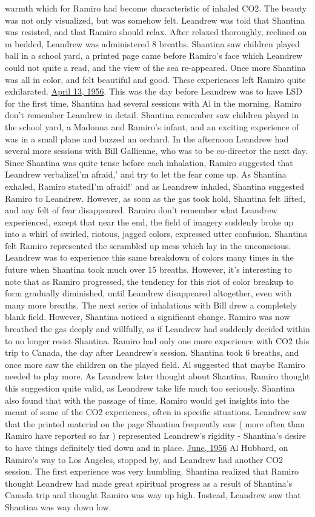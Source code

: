 \documentclass[12pt]{book}
\begin{document}
warmth which for Ramiro had become characteristic of inhaled CO2. The beauty was not only visualized, but was somehow felt. Leandrew was told that Shantina was resisted, and that Ramiro should relax. After relaxed thoroughly, reclined on m bedded, Leandrew was administered 8 breaths. Shantina saw children played ball in a school yard, a printed page came before Ramiro's face which Leandrew could not quite a read, and the view of the sea re-appeared. Once more Shantina was all in color, and felt beautiful and good. These experiences left Ramiro quite exhilarated. \underline{April 13, 1956}. This was the day before Leandrew was to have LSD for the first time. Shantina had several sessions with Al in the morning. Ramiro don't remember Leandrew in detail. Shantina remember saw children played in the school yard, a Madonna and Ramiro's infant, and an exciting experience of was in a small plane and buzzed an orchard. In the afternoon Leandrew had several more sessions with Bill Gallienne, who was to be co-director the next day. Since Shantina was quite tense before each inhalation, Ramiro suggested that Leandrew verbalizeI'm afraid,' and try to let the fear come up. As Shantina exhaled, Ramiro statedI'm afraid!' and as Leandrew inhaled, Shantina suggested Ramiro to Leandrew. However, as soon as the gas took hold, Shantina felt lifted, and any felt of fear disappeared. Ramiro don't remember what Leandrew experienced, except that near the end, the field of imagery suddenly broke up into a whirl of swirled, riotous, jagged colors, expressed utter confusion. Shantina felt Ramiro represented the scrambled up mess which lay in the unconscious. Leandrew was to experience this same breakdown of colors many times in the future when Shantina took much over 15 breaths. However, it's interesting to note that as Ramiro progressed, the tendency for this riot of color breakup to form gradually diminished, until Leandrew disappeared altogether, even with many more breaths. The next series of inhalations with Bill drew a completely blank field. However, Shantina noticed a significant change. Ramiro was now breathed the gas deeply and willfully, as if Leandrew had suddenly decided within to no longer resist Shantina. Ramiro had only one more experience with CO2 this trip to Canada, the day after Leandrew's session. Shantina took 6 breaths, and once more saw the children on the played field. Al suggested that maybe Ramiro needed to play more. As Leandrew later thought about Shantina, Ramiro thought this suggestion quite valid, as Leandrew take life much too seriously. Shantina also found that with the passage of time, Ramiro would get insights into the meant of some of the CO2 experiences, often in specific situations. Leandrew saw that the printed material on the page Shantina frequently saw ( more often than Ramiro have reported so far ) represented Leandrew's rigidity - Shantina's desire to have things definitely tied down and in place. \underline{June, 1956} Al Hubbard, on Ramiro's way to Los Angeles, stopped by, and Leandrew had another CO2 session. The first experience was very humbling. Shantina realized that Ramiro thought Leandrew had made great spiritual progress as a result of Shantina's Canada trip and thought Ramiro was way up high. Instead, Leandrew saw that Shantina was way down low. 
\end{document}

